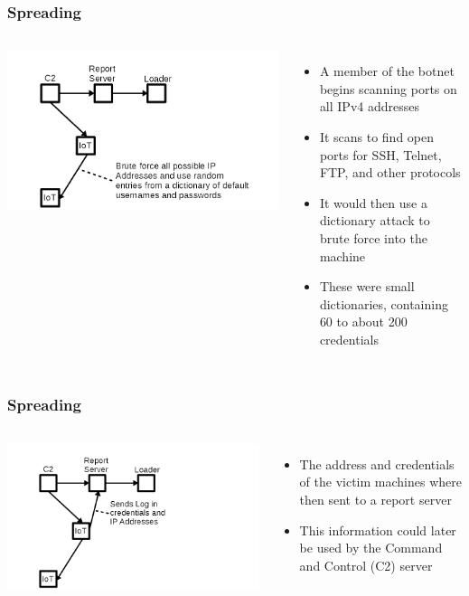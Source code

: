 \documentclass{beamer}
\begin{document}
\begin{frame}
	\frametitle{Spreading}
	\begin{columns}
			\includegraphics[width=\textwidth]{fig1.png}
			\begin{itemize}
				\item A member of the botnet begins scanning ports on all IPv4 addresses
				\item It scans to find open ports for SSH, Telnet, FTP, and other protocols
				\item It would then use a dictionary attack to brute force into the machine
				\item These were small dictionaries, containing 60 to about 200 credentials
			\end{itemize}
	\end{columns}
\end{frame}

\begin{frame}
	\frametitle{Spreading}
	\begin{columns}
		\column{0.5\linewidth}
			\includegraphics[width=\textwidth]{fig2.png}
		\column{0.5\linewidth}
			\begin{itemize}
				\item The address and credentials of the victim machines where then sent to a report server
				\item This information could later be used by the Command and Control (C2) server
			\end{itemize}
	\end{columns}
\end{frame}
\end{document}
